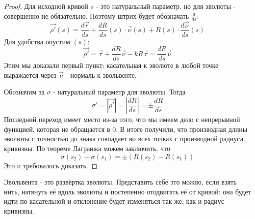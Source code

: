 
\begin{proof}	
	Для исходной кривой $s$ - это натуральный параметр, но для эволюты - совершенно не обязательно. Поэтому штрих будет обозначать $\frac{d}{ds}$:
	\[
		\vec{\rho'}(s) = \frac{d\vec{r}}{ds} + \frac{dR}{ds}(s) \cdot \vec{\nu}(s) + R(s) \cdot \frac{d\vec{\nu}}{ds}(s)
	\]
	Для удобства опустим $(s)$:
	\[
		\vec{\rho'} = \vec{\tau} + \frac{dR}{ds}\vec{\nu} - kR\vec{\tau} = \frac{dR}{ds} \vec{\nu}
	\]
	Этим мы доказали первый пункт: касательная к эволюте в любой точке выражается через $\vec{\nu}$ - нормаль к эвольвенте.
	
	Обозначим за $\sigma$ - натуральный параметр для эволюты. Тогда
	\[
		\sigma' = |\vec{\rho'}| = \left|\frac{dR}{ds}\right| = \pm \frac{dR}{ds}
	\]
	Последний переход имеет место из-за того, что мы имеем дело с непрерывной функцией, которая не обращается в 0. В итоге получили, что производная длины эволюты с точностью до знака совпадает во всех точках с производной радиуса кривизны. По теореме Лагранжа можем заключить, что
	\[
		\sigma(s_2) - \sigma(s_1) = \pm(R(s_2) - R(s_1))
	\]
	Это и требовалось доказать.
\end{proof}

\begin{note}
	Эвольвента - это развёртка эволюты. Представить себе это можно, если взять нить, натянуть её вдоль эволюты и постепенно отодвигать её от кривой: она будет идти по касательной и отклонение будет изменяться так же, как и радиус кривизны.
\end{note}